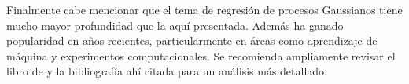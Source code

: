 Finalmente cabe mencionar que el tema de regresión de procesos Gaussianos tiene mucho mayor profundidad que la aquí presentada. Además ha ganado popularidad en años recientes, particularmente en áreas como aprendizaje de máquina y experimentos computacionales. Se recomienda ampliamente revisar el libro de \cite{rasmussen_and_williams} y la bibliografía ahí citada para un análisis más detallado. \\